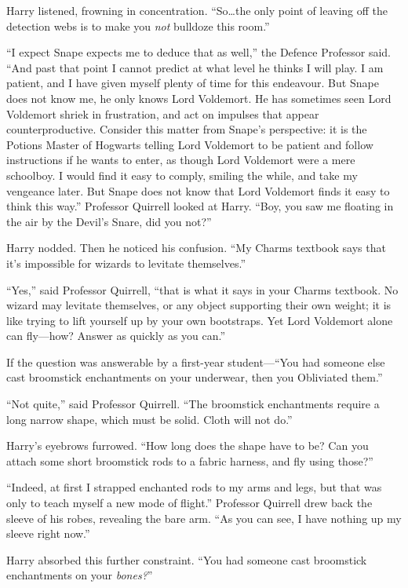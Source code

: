 Harry listened, frowning in concentration. “So…the only point of leaving off the detection webs is to make you \emph{not} bulldoze this room.”

“I expect Snape expects me to deduce that as well,” the Defence Professor said. “And past that point I cannot predict at what level he thinks I will play. I am patient, and I have given myself plenty of time for this endeavour. But Snape does not know me, he only knows Lord Voldemort. He has sometimes seen Lord Voldemort shriek in frustration, and act on impulses that appear counterproductive. Consider this matter from Snape’s perspective: it is the Potions Master of Hogwarts telling Lord Voldemort to be patient and follow instructions if he wants to enter, as though Lord Voldemort were a mere schoolboy. I would find it easy to comply, smiling the while, and take my vengeance later. But Snape does not know that Lord Voldemort finds it easy to think this way.” Professor Quirrell looked at Harry. “Boy, you saw me floating in the air by the Devil’s Snare, did you not?”

Harry nodded. Then he noticed his confusion. “My Charms textbook says that it’s impossible for wizards to levitate themselves.”

“Yes,” said Professor Quirrell, “that is what it says in your Charms textbook. No wizard may levitate themselves, or any object supporting their own weight; it is like trying to lift yourself up by your own bootstraps. Yet Lord Voldemort alone can fly—how? Answer as quickly as you can.”

If the question was answerable by a first-year student—“You had someone else cast broomstick enchantments on your underwear, then you Obliviated them.”

“Not quite,” said Professor Quirrell. “The broomstick enchantments require a long narrow shape, which must be solid. Cloth will not do.”

Harry’s eyebrows furrowed. “How long does the shape have to be? Can you attach some short broomstick rods to a fabric harness, and fly using those?”

“Indeed, at first I strapped enchanted rods to my arms and legs, but that was only to teach myself a new mode of flight.” Professor Quirrell drew back the sleeve of his robes, revealing the bare arm. “As you can see, I have nothing up my sleeve right now.”

Harry absorbed this further constraint. “You had someone cast broomstick enchantments on your \emph{bones?}”

